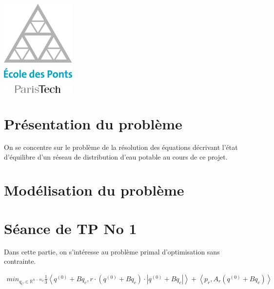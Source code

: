 \begin{titlepage}

\includegraphics[width=10em]{header_logo.png}\\[1cm] %
 

\vfill %

\end{titlepage}

\section{Présentation du problème}

On se concentre sur le problème de la résolution des équations décrivant l'état d'équilibre d'un réseau de distribution d'eau potable au cours de ce projet. 

\section{Modélisation du problème}

\section{Séance de TP No 1}

Dans cette partie, on s'intéresse au problème primal d'optimisation sans contrainte.

\vspace{-1.5em}
\begin{align}
  min_{q_C \in \mathbb{R}^{n-m_d}} \frac{1}{3} \left \langle q^{(0)} + B q_c, r \cdot (q^{(0)} + B q_c) \cdot |q^{(0)} + B q_c| \right \rangle + \left \langle p_r, A_r(q^{(0)} + B q_c) \right \rangle
\end{align}

